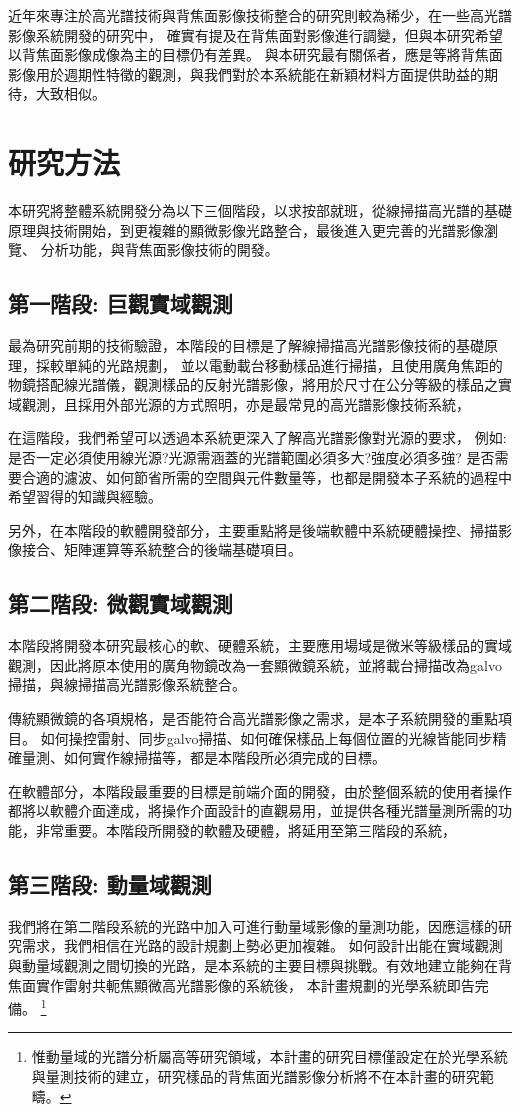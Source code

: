 \documentclass[12pt]{article}
\begin{document}
近年來專注於高光譜技術與背焦面影像技術整合的研究則較為稀少，在一些高光譜影像系統開發的研究中，
確實有提及在背焦面對影像進行調變\cite{gao2010snapshot}，但與本研究希望以背焦面影像成像為主的目標仍有差異。
與本研究最有關係者，應是\cite{phdthesis}等將背焦面影像用於週期性特徵的觀測，與我們對於本系統能在新穎材料方面提供助益的期待，大致相似。

\section{研究方法}
本研究將整體系統開發分為以下三個階段，以求按部就班，從線掃描高光譜的基礎原理與技術開始，到更複雜的顯微影像光路整合，最後進入更完善的光譜影像瀏覽、
分析功能，與背焦面影像技術的開發。
\subsection{第一階段: 巨觀實域觀測} \label{macroreal}
最為研究前期的技術驗證，本階段的目標是了解線掃描高光譜影像技術的基礎原理，採較單純的光路規劃，
並以電動載台移動樣品進行掃描，且使用廣角焦距的物鏡搭配線光譜儀，觀測樣品的反射光譜影像，將用於尺寸在公分等級的樣品之實域觀測，且採用外部光源的方式照明，亦是最常見的高光譜影像技術系統，

在這階段，我們希望可以透過本系統更深入了解高光譜影像對光源的要求，
例如: 是否一定必須使用線光源?光源需涵蓋的光譜範圍必須多大?強度必須多強?
是否需要合適的濾波、如何節省所需的空間與元件數量等，也都是開發本子系統的過程中希望習得的知識與經驗。

另外，在本階段的軟體開發部分，主要重點將是後端軟體中系統硬體操控、掃描影像接合、矩陣運算等系統整合的後端基礎項目。
\subsection{第二階段: 微觀實域觀測} \label{microreal}
本階段將開發本研究最核心的軟、硬體系統，主要應用場域是微米等級樣品的實域觀測，因此將原本使用的廣角物鏡改為一套顯微鏡系統，並將載台掃描改為galvo掃描，與線掃描高光譜影像系統整合。

傳統顯微鏡的各項規格，是否能符合高光譜影像之需求，是本子系統開發的重點項目。
如何操控雷射、同步galvo掃描、如何確保樣品上每個位置的光線皆能同步精確量測、如何實作線掃描等，都是本階段所必須完成的目標。

在軟體部分，本階段最重要的目標是前端介面的開發，由於整個系統的使用者操作都將以軟體介面達成，將操作介面設計的直觀易用，並提供各種光譜量測所需的功能，非常重要。本階段所開發的軟體及硬體，將延用至第三階段的系統，

\subsection{第三階段: 動量域觀測} \label{momentum}
我們將在第二階段系統的光路中加入可進行動量域影像的量測功能，因應這樣的研究需求，我們相信在光路的設計規劃上勢必更加複雜。
如何設計出能在實域觀測與動量域觀測之間切換的光路，是本系統的主要目標與挑戰。有效地建立能夠在背焦面實作雷射共軛焦顯微高光譜影像的系統後，
本計畫規劃的光學系統即告完備。
\footnote{惟動量域的光譜分析屬高等研究領域，本計畫的研究目標僅設定在於光學系統與量測技術的建立，研究樣品的背焦面光譜影像分析將不在本計畫的研究範疇。}
\end{document}
